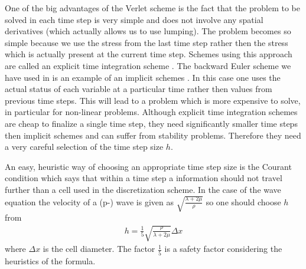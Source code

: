 One of the big advantages of the Verlet scheme is the fact that the problem to be solved 
in each time step is very simple and does not involve any spatial derivatives (which actually allows us to use lumping).
The problem becomes so simple because we use the stress from the last time step rather then the stress which is
actually present at the current time step. Schemes using this approach are called an explicit time integration 
scheme  . The 
backward Euler scheme we have used in  is 
an example of an implicit schemes
 . In this case one uses the actual status of 
each variable at a particular time rather then values from previous time steps. This will lead to a problem which is 
more expensive to solve, in particular for non-linear problems. 
Although 
explicit time integration schemes are cheap to finalize a single time step, they need significantly smaller time
steps then implicit schemes and can suffer from stability problems. Therefore they need a 
very careful selection of the time step size $h$.

An easy, heuristic way of choosing an appropriate
time step size is the Courant condition  
which says that within a time step a information should not travel further than a cell used in the 
discretization scheme. In the case of the wave equation the velocity of a (p-) wave is given as
$\sqrt{\frac{\lambda+2\mu}{\rho}}$ so one should choose $h$ from
\begin{eqnarray}\label{WAVE dyn 66}
h= \frac{1}{5} \sqrt{\frac{\rho}{\lambda+2\mu}} \Delta x
\end{eqnarray}
where $\Delta x$ is the cell diameter. The factor $\frac{1}{5}$ is a safety factor considering the heuristics of 
the formula.

